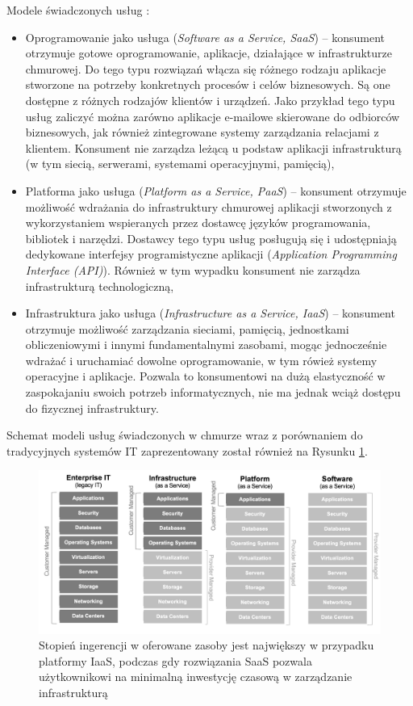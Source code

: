 \documentclass[12pt,a4paper,twoside]{article}
\begin{document}
\noindent
Modele świadczonych usług :
\begin{itemize}
\item Oprogramowanie jako usługa (\textit{Software as a Service, SaaS}) -- konsument otrzymuje gotowe oprogramowanie, aplikacje, działające w infrastrukturze chmurowej. Do tego typu rozwiązań włącza się różnego rodzaju aplikacje stworzone na potrzeby konkretnych procesów i celów biznesowych. Są one dostępne z różnych rodzajów klientów i urządzeń. Jako przykład tego typu usług zaliczyć można zarówno aplikacje e-mailowe skierowane do odbiorców biznesowych, jak również zintegrowane systemy zarządzania relacjami z klientem. Konsument nie zarządza leżącą u podstaw aplikacji infrastrukturą (w tym siecią, serwerami, systemami operacyjnymi, pamięcią),
\item Platforma jako usługa (\textit{Platform as a Service, PaaS}) -- konsument otrzymuje możliwość wdrażania do infrastruktury chmurowej aplikacji stworzonych z wykorzystaniem wspieranych przez dostawcę języków programowania, bibliotek i narzędzi. Dostawcy tego typu usług posługują się i udostępniają dedykowane interfejsy programistyczne aplikacji (\textit{Application Programming Interface (API)}). Również w tym wypadku konsument nie zarządza infrastrukturą technologiczną,
\item Infrastruktura jako usługa (\textit{Infrastructure as a Service, IaaS}) -- konsument otrzymuje możliwość zarządzania sieciami, pamięcią, jednostkami obliczeniowymi i innymi fundamentalnymi zasobami, mogąc jednocześnie wdrażać i uruchamiać dowolne oprogramowanie, w tym rówież systemy operacyjne i aplikacje. Pozwala to konsumentowi na dużą elastyczność w zaspokajaniu swoich potrzeb informatycznych, nie ma jednak wciąż dostępu do fizycznej infrastruktury.
\end{itemize}

Schemat modeli usług świadczonych w chmurze wraz z porównaniem do tradycyjnych systemów IT zaprezentowany został również na Rysunku \ref{fig:cloudarch}.

\begin{figure}[h]
  \centering
\includegraphics[width=\textwidth, keepaspectratio]{../obrazy/fig:cloudarch.png}
\caption{Stopień ingerencji w oferowane zasoby jest największy w przypadku platformy IaaS, podczas gdy rozwiązania SaaS pozwala użytkownikowi na minimalną inwestycję czasową w zarządzanie infrastrukturą \label{fig:cloudarch}}
\end{figure}
\end{document}

